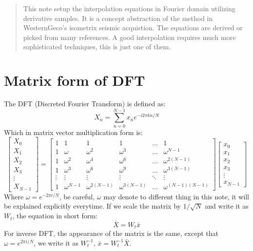 \documentclass[12pt]{article}
\begin{document}
\maketitle

\begin{abstract}
This note setup the interpolation equations in Fourier domain utilizing derivative samples.
It is a concept abstraction of the method in WesternGeco's isometrix seismic acquistion.
The equations are derived or picked from many references. A good interpolation requires much more sophisticated
techniques, this is just one of them.
\end{abstract}

\section{Matrix form of DFT}
The DFT (Discreted Fourier Transform) is defined as:
\begin{equation}
    X_n = \sum_{n=0}^{N-1} x_n e ^ {-i2\pi kn/N}
\end{equation}
Which in matrix vector multiplication form is:
\begin{equation}
\begin{bmatrix}
    X_0 \\ X_1 \\ X_2 \\ X_3 \\ \vdots \\ X_{N-1} 
\end{bmatrix}
=
    \begin{bmatrix}
        1 & 1 & 1 & 1 & \ldots & 1 \\
        1 & \omega & \omega^2 & \omega^3 & \ldots & \omega^{N-1} \\
        1 & \omega^2 & \omega^4 & \omega^6 & \ldots & \omega^{2(N-1)} \\
        1 & \omega^3 & \omega^6 & \omega^9 & \ldots & \omega^{3(N-1)} \\
        \vdots & \vdots & \vdots & \vdots & \ddots & \vdots \\
        1 & \omega^{N-1} & \omega^{2(N-1)} & \omega^{3(N-1)} & \ldots & \omega^{(N-1)(N-1)} 
    \end{bmatrix}
    \begin{bmatrix}
        x_0 \\ x_1 \\ x_2 \\ x_3 \\ \vdots \\ x_{N-1}
    \end{bmatrix}
\end{equation}
Where $\omega=e^{-2\pi i/N}$, be careful, $\omega$ may denote to different thing in this note,
it will be explained explicitly everytime.
If we scale the matrix by $1/\sqrt{N}$ and write it as $W_t$, the equation in short form:
\begin{equation}
    \bar{X} = W_t\bar{x}
\end{equation}
For inverse DFT, the appearance of the matrix is the same, except that $\omega=e^{2\pi i/N}$, 
we write it as $W_t^{-1}$, $\bar{x} = W_t^{-1}\bar{X}$.
\end{document}
